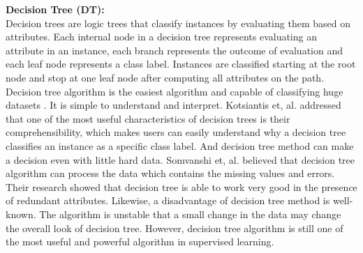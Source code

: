\documentclass[10pt,journal,compsoc]{IEEEtran}
\begin{document}
\textbf{Decision Tree (DT):\\}
Decision trees are logic trees that classify instances by evaluating them based on attributes. Each internal node in a decision tree represents evaluating an attribute in an instance, each branch represents the outcome of evaluation and each leaf node represents a class label. Instances are classified starting at the root node and stop at one leaf node after computing all attributes on the path. Decision tree algorithm is the easiest algorithm and capable of classifying huge datasets \cite{Somvanshi}.
It is simple to understand and interpret. Kotsiantis et, al. \cite{Kotsiantis}addressed that one of the most useful characteristics of decision trees is their comprehensibility, which makes users can easily understand why a decision tree classifies an instance as a specific class label. And decision tree method can make a decision even with little hard data. Somvanshi et, al. \cite{Somvanshi} believed that decision tree algorithm can process the data which contains the missing values and errors. Their research showed that decision tree is able to work very good in the presence of redundant attributes. Likewise, a disadvantage of decision tree method is well-known. The algorithm is unstable that a small change in the data may change the overall look of decision tree. However, decision tree algorithm is still one of the most useful and powerful algorithm in supervised learning. 
\end{document}
